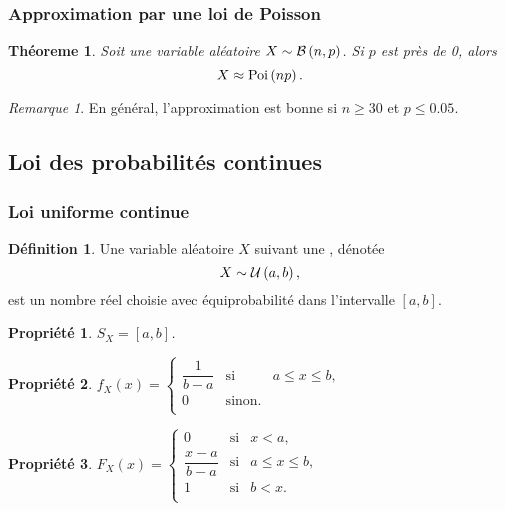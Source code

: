\documentclass[11pt]{article}
\makeatletter
\newcommand\Bin[2]{%
	\ensuremath{%
		\mathcal{B}\left(#1,#2\right)%
	}%
}%
\newcommand\Poi[1]{%
	\ensuremath{%
		\mathrm{Poi}\left(#1\right)%
	}%
}%
\newcommand\Uni[2]{%
	\ensuremath{%
		\mathcal{U}\left(#1,#2\right)%
	}%
}%
\newtheorem{theoreme}{Théoreme}[section]
\newtheorem{property}{Propriété}
\theoremstyle{remark}
\newtheorem*{remark}{Remarque}
\theoremstyle{definition}
\newtheorem*{@definition}{Définition}
\newenvironment{definition}{%
	\begin{@definition}%
}{%
	\end{@definition}%
	\setcounter{property}{0}%
}
\makeatother
\begin{document}
\subsubsection{Approximation par une loi de Poisson}
\begin{theoreme}
	Soit une variable aléatoire $X\sim\Bin{n}{p}$. Si $p$ est près de 0, alors
	\begin{equation*}
		X\approx\Poi{np}.
	\end{equation*}
\end{theoreme}


\begin{remark}
	En général, l'approximation est bonne si $n\geq 30$ et $p\leq 0.05$.
\end{remark}

\subsection{Loi des probabilités continues}
\subsubsection{Loi uniforme continue}
\begin{definition}
	Une variable aléatoire $X$ suivant une ,
	dénotée
	\begin{equation*}
		X\sim\Uni{a}{b},
	\end{equation*}
	est un nombre réel choisie avec équiprobabilité dans l'intervalle $[a,b]$. 
\end{definition}

\begin{property}
	$S_X=[a,b]$.
\end{property}

\begin{property}
	$f_X(x)=\left\{
		\begin{matrix}
			\dfrac{1}{b-a} & \text{si} & a\leq x\leq b,\\
			0              & \text{sinon}.\\
		\end{matrix}
	\right.$
\end{property}

\begin{property}
	$F_X(x)=\left\{
		\begin{matrix}
			0                & \text{si} & x<a,\\
			\dfrac{x-a}{b-a} & \text{si} & a\leq x\leq b,\\
			1                & \text{si} & b<x.\\
		\end{matrix}
	\right.$
\end{property}
\end{document}
